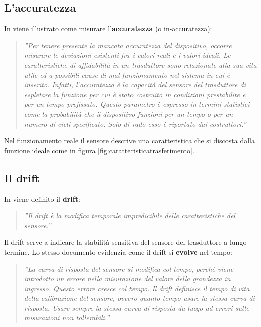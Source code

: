\documentclass[a4paper]{report} %
\begin{document}
\subsection{L'accuratezza}
In \cite{art:rif.13} viene illustrato come misurare l'\textbf{accuratezza} (o in-accuratezza):
\begin{quote}
	\textit{''Per tenere presente la mancata accuratezza del dispositivo, occorre misurare le deviazioni esistenti fra i valori reali e i valori ideali. 
	Le caratteristiche di affidabilità in un trasduttore sono relazionate alla sua vita utile ed a possibili cause di mal funzionamento nel sistema in cui è inserito.
	Infatti, l'accuratezza è la capacità del sensore del trasduttore di espletare la funzione per cui è stato costruito in condizioni prestabilite e per un tempo prefissato. Questo parametro è espresso in termini statistici come la probabilità che il dispositivo funzioni per un tempo o per un numero di cicli specificato. Solo di rado esso è riportato dai costruttori.''}
\end{quote}
Nel funzionamento reale il sensore descrive una caratteristica che si discosta dalla funzione ideale come in figura \ref{fig:caratteristicatrasferimento}.

\subsection{Il drift}
In \cite{art:rif.14} viene definito il \textbf{drift}:
\begin{quote}
	\textit{''Il drift è la modifica temporale impredicibile delle caratteristiche del sensore.''}  
\end{quote}
Il drift serve a indicare la stabilità sensitiva del sensore del trasduttore a lungo termine. Lo stesso documento evidenzia come il drift si \textbf{evolve} nel tempo:
\begin{quote}
	\textit{''La curva di risposta del sensore si modifica col tempo, perché viene introdotto un errore nella misurazione del valore della grandezza in ingresso. Questo errore cresce col tempo. Il drift definisce il tempo di vita della calibrazione del sensore, ovvero quanto tempo usare la stessa curva di risposta. Usare sempre la stessa curva di risposta da luogo ad errori sulle misurazioni non tollerabili.''}
\end{quote}
\end{document}
